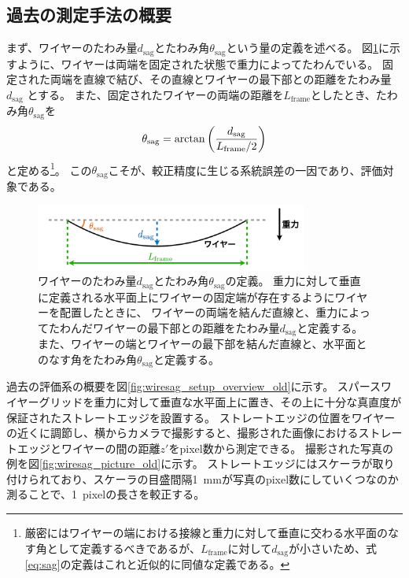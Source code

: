 \documentclass[../../main.tex]{subfiles}
\begin{document}
\subsection{過去の測定手法の概要}
まず、ワイヤーのたわみ量$d_{\mathrm{sag}}$とたわみ角$\theta_{\mathrm{sag}}$という量の定義を述べる。
図\ref{fig:wiresag_def}に示すように、ワイヤーは両端を固定された状態で重力によってたわんでいる。
固定された両端を直線で結び、その直線とワイヤーの最下部との距離をたわみ量 $d_{\mathrm{sag}}$ とする。
また、固定されたワイヤーの両端の距離を$L_{\mathrm{frame}}$としたとき、たわみ角$\theta_{\mathrm{sag}}$を
\begin{equation}
    \label{eq:sag}
    \theta_{\mathrm{sag}} = \arctan\qty(\dfrac{d_{\mathrm{sag}}}{L_{\mathrm{frame}}/2})
\end{equation}
と定める\footnote{厳密にはワイヤーの端における接線と重力に対して垂直に交わる水平面のなす角として定義するべきであるが、$L_{\mathrm{frame}}$に対して$d_{\mathrm{sag}}$が小さいため、式\eqref{eq:sag}の定義はこれと近似的に同値な定義である。}。
この$\theta_{\mathrm{sag}}$こそが、較正精度に生じる系統誤差の一因であり、評価対象である。
\begin{figure}[H]
    \centering
    \includegraphics[width=0.8\textwidth]{wiresag/wiresag_def.pdf}
    \caption{ワイヤーのたわみ量$d_\mathrm{sag}$とたわみ角$\theta_{\mathrm{sag}}$の定義。
    重力に対して垂直に定義される水平面上にワイヤーの固定端が存在するようにワイヤーを配置したときに、
    ワイヤーの両端を結んだ直線と、重力によってたわんだワイヤーの最下部との距離をたわみ量$d_\mathrm{sag}$と定義する。
    また、ワイヤーの端とワイヤーの最下部を結んだ直線と、水平面とのなす角をたわみ角$\theta_{\mathrm{sag}}$と定義する。
    }
    \label{fig:wiresag_def}
\end{figure}
過去の評価系の概要を図\ref{fig:wiresag_setup_overview_old}に示す。
スパースワイヤーグリッドを重力に対して垂直な水平面上に置き、その上に十分な真直度が保証されたストレートエッジを設置する。
ストレートエッジの位置をワイヤーの近くに調節し、横からカメラで撮影すると、撮影された画像におけるストレートエッジとワイヤーの間の距離$z'$をpixel数から測定できる。
撮影された写真の例を図\ref{fig:wiresag_picture_old}に示す。
ストレートエッジにはスケーラが取り付けられており、スケーラの目盛間隔\SI{1}{mm}が写真のpixel数にしていくつなのか測ることで、\SI{1}{pixel}の長さを較正する。
\end{document}
